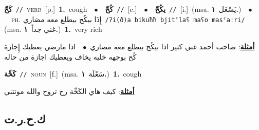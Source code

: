 \documentclass[10pt,a4paper,twoside]{article} %
\begin{document}
\begin{multicols}{2}
{\setlength\topsep{0pt}\textbf{\foreignlanguage{arabic}{كَحّ}}\ {\color{gray}\texttt{//}\color{black}}\ \textsc{verb}\ [p.]\ \textbf{1.}~cough\ \ $\bullet$\ \ \setlength\topsep{0pt}\textbf{\foreignlanguage{arabic}{كُحّ}}\ {\color{gray}\texttt{//}\color{black}}\ [c.]\ \ $\bullet$\ \ \setlength\topsep{0pt}\textbf{\foreignlanguage{arabic}{يكُحّ}}\ {\color{gray}\texttt{//}\color{black}}\ [i.]\ \color{gray}(msa. \foreignlanguage{arabic}{يَسْعَل}~\foreignlanguage{arabic}{\textbf{١.}})\color{black}\ \ $\bullet$\ \ \textsc{ph.} \color{gray} \foreignlanguage{arabic}{إِذَا بيكُح بيطلع معه مصَاري}\color{black}\ {\color{gray}\texttt{/{\sffamily ʔi(ð)a bikuħħ bjitˤlaʕ maʕo masˤaːri}/}\color{black}}\ \color{gray} (msa. \foreignlanguage{arabic}{غني جداً}~\foreignlanguage{arabic}{\textbf{١.}})\color{black}\ \textbf{1.}~very rich\  \begin{flushright}\color{gray}\foreignlanguage{arabic}{\textbf{\underline{\foreignlanguage{arabic}{أمثلة}}}: صاحب أحمد غني كثير اذا بيكُح بيطلع معه مصاري\ $\bullet$\ \  اذا مارضي يعطيك إِجازة كُح بوجهه خليه يخاف ويعطيك اجازة من حاله}\end{flushright}\color{black}} \vspace{2mm}

{\setlength\topsep{0pt}\textbf{\foreignlanguage{arabic}{كَحِّة}}\ {\color{gray}\texttt{//}\color{black}}\ \textsc{noun}\ [f.]\ \color{gray}(msa. \foreignlanguage{arabic}{سَعْلَة}~\foreignlanguage{arabic}{\textbf{١.}})\color{black}\ \textbf{1.}~cough\  \begin{flushright}\color{gray}\foreignlanguage{arabic}{\textbf{\underline{\foreignlanguage{arabic}{أمثلة}}}: كيف هاي الكَحِّة رح تروح والله موتتني}\end{flushright}\color{black}} \vspace{2mm}

\vspace{-3mm}
\subsection*{\color{blue}\foreignlanguage{arabic}{ك.ح.ر.ت}\color{blue}{}} 


\end{multicols}
\end{document}

